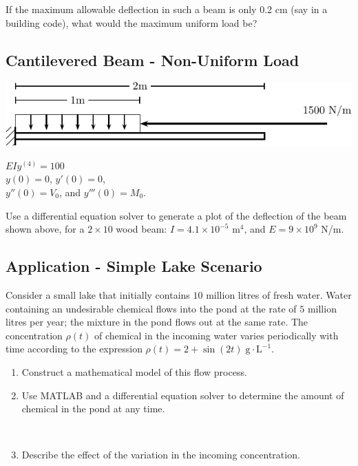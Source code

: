 \newpage
\problem If the maximum allowable deflection in such a beam is only
0.2 cm (say in a building code), what would the maximum uniform load
be?

\newpage

\subsection*{Cantilevered Beam - Non-Uniform Load}

\begin{minipage}[t]{0.55\linewidth}
\vspace{0pt}
\includegraphics[width=1.0\linewidth]{graphics/notes_09_beams2}
\end{minipage}
\begin{minipage}[t]{0.45\linewidth}
  \vspace{0pt}
  $EI y^{(4)} = 100$ \\
  $y(0) = 0$, $y'(0) = 0$,  \\
  $y''(0) = V_0$, and $y'''(0) = M_0$.
\end{minipage}

\problem Use a differential equation solver to generate a plot of the
deflection of the beam shown above, for a $2\times10$ wood beam:
$I = 4.1 \times 10^{-5}$ m$^4$, and $E = 9 \times 10^9$ N/m.

\newpage

\subsection{Application - Simple Lake Scenario}
\begin{problem}
  Consider a small lake that initially contains $10$ million litres of
  fresh water.  Water containing an undesirable chemical flows into
  the pond at the rate of $5$ million litres per year; the mixture in
  the pond flows out at the same rate.  The concentration $\rho(t)$ of
  chemical in the incoming water varies periodically with time
  according to the expression
  $\rho(t) = 2 + \sin(2t) \; \text{g} \cdot \text{L}^{-1}$.
  \begin{enumerate}
  \item Construct a mathematical model of this flow process.
\newpage
\item Use MATLAB and a differential equation solver to determine the
  amount of chemical in the pond at any time.

\newpage
~
\newpage
  \item Describe the effect of the variation in the incoming concentration.
  \end{enumerate}
\end{problem}

